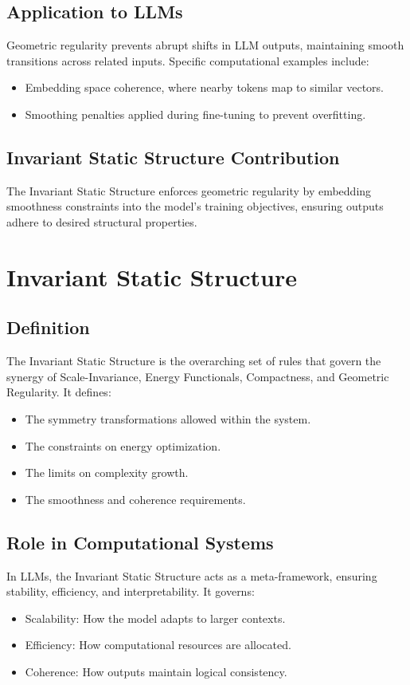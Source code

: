 \subsection{Application to LLMs}
Geometric regularity prevents abrupt shifts in LLM outputs, maintaining smooth transitions across related inputs. Specific computational examples include:
\begin{itemize}
    \item Embedding space coherence, where nearby tokens map to similar vectors.
    \item Smoothing penalties applied during fine-tuning to prevent overfitting.
\end{itemize}

\subsection{Invariant Static Structure Contribution}
The Invariant Static Structure enforces geometric regularity by embedding smoothness constraints into the model’s training objectives, ensuring outputs adhere to desired structural properties.

\section{Invariant Static Structure}

\subsection{Definition}
The Invariant Static Structure is the overarching set of rules that govern the synergy of Scale-Invariance, Energy Functionals, Compactness, and Geometric Regularity. It defines:
\begin{itemize}
    \item The symmetry transformations allowed within the system.
    \item The constraints on energy optimization.
    \item The limits on complexity growth.
    \item The smoothness and coherence requirements.
\end{itemize}

\subsection{Role in Computational Systems}
In LLMs, the Invariant Static Structure acts as a meta-framework, ensuring stability, efficiency, and interpretability. It governs:
\begin{itemize}
    \item Scalability: How the model adapts to larger contexts.
    \item Efficiency: How computational resources are allocated.
    \item Coherence: How outputs maintain logical consistency.
\end{itemize}

